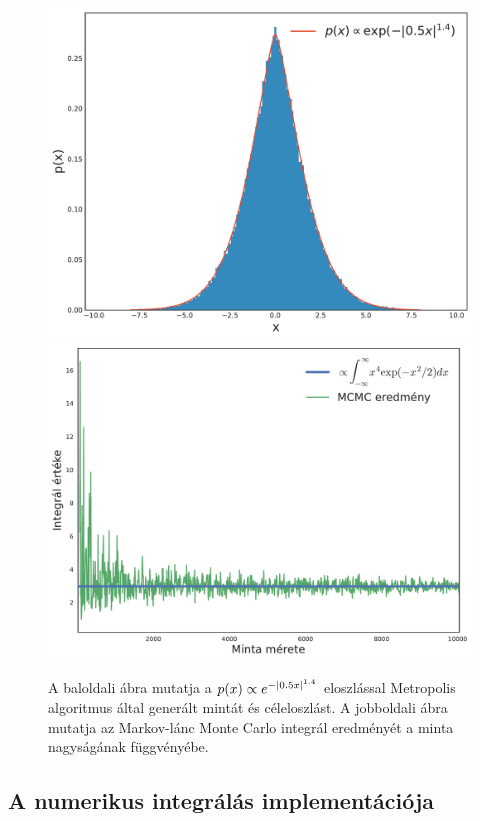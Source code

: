 \documentclass[11pt,a4paper]{article}
\numberwithin{equation}{subsection}
\numberwithin{figure}{section}
\begin{document}
\begin{figure}[H]
\centering
\includegraphics[scale=0.35]{pic/Coulomb/MCSamples.pdf}
\includegraphics[scale=0.33]{pic/Coulomb/MCMCInt.pdf}
\caption{A baloldali ábra mutatja a $p(x)\propto e^{-\abs{0.5x}^{1.4}}$ eloszlással Metropolis algoritmus által generált mintát és céleloszlást. A jobboldali ábra mutatja az Markov-lánc Monte Carlo integrál eredményét a minta nagyságának függvényébe. }
\label{fig:MCMC}
\end{figure}

\subsection{A numerikus integrálás implementációja}
\end{document}
